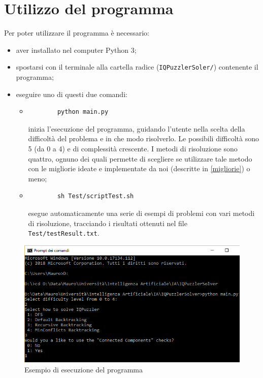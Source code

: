 \section{Utilizzo del programma}
Per poter utilizzare il programma è necessario:
\begin{itemize}
	\item aver installato nel computer Python 3;
	\item spostarsi con il terminale alla cartella radice (\texttt{IQPuzzlerSoler/}) contenente il programma;
	\item eseguire uno di questi due comandi:
	\begin{itemize}
		\item \begin{verbatim}
		python main.py
		\end{verbatim}inizia l'esecuzione del programma, guidando l'utente nella scelta della difficoltà del problema e in che modo risolverlo. Le possibili difficoltà sono 5 (da 0 a 4) e di complessità crescente. I metodi di risoluzione sono quattro, ognuno dei quali permette di scegliere se utilizzare tale metodo con le migliorie ideate e implementate da noi (descritte in \ref{migliorie}) o meno; 
		\item \begin{verbatim}
		sh Test/scriptTest.sh
		\end{verbatim}esegue automaticamente una serie di esempi di problemi con vari metodi di risoluzione, tracciando i risultati ottenuti nel file \texttt{Test/testResult.txt}. 
	\end{itemize}
\end{itemize}
\begin{figure}[h]
	\centering
	\includegraphics[scale=0.65]{immagini/exe}
	\caption{Esempio di esecuzione del programma}
	\label{fig:exe}
\end{figure}


